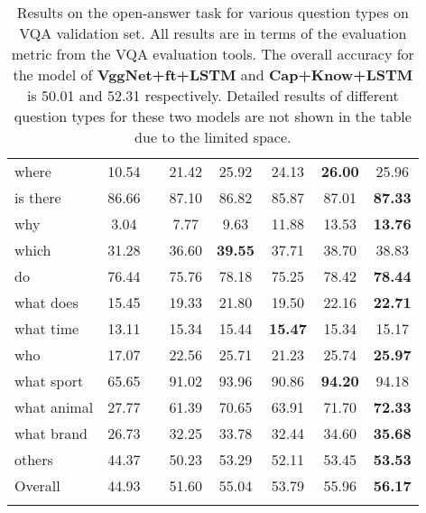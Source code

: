 \documentclass[10pt,journal,compsoc]{IEEEtran}
\begin{document}
\begin{table}[t!]
{\begin{tabular}{lclccccc}
  where                        & 10.54        &  & 21.42            & 25.92            & 24.13            & \textbf{26.00}   & 25.96 \\
  is there                     & 86.66        &  & 87.10            & 86.82            & 85.87            & 87.01            & \textbf{87.33} \\
  why                          & 3.04         &  & 7.77             & 9.63             & 11.88            & 13.53            & \textbf{13.76}  \\
  which                        & 31.28        &  & 36.60            & \textbf{39.55}   & 37.71            & 38.70            & 38.83 \\
  do                           & 76.44        &  & 75.76            & 78.18            & 75.25            & 78.42            & \textbf{78.44} \\
  what does                    & 15.45        &  & 19.33            & 21.80            & 19.50            & 22.16            & \textbf{22.71} \\
  what time                    & 13.11        &  & 15.34            & 15.44            & \textbf{15.47}   & 15.34            & 15.17 \\
  who                          & 17.07        &  & 22.56            & 25.71            & 21.23            & 25.74            & \textbf{25.97} \\
  what sport                   & 65.65        &  & 91.02            & 93.96            & 90.86            & \textbf{94.20}   & 94.18 \\
  what animal                  & 27.77        &  & 61.39            & 70.65            & 63.91            & 71.70            & \textbf{72.33} \\
  what brand                   & 26.73        &  & 32.25            & 33.78            & 32.44            & 34.60            & \textbf{35.68} \\
  others                       & 44.37        &  & 50.23            & 53.29            & 52.11            & 53.45            & \textbf{53.53}     \\ \hline
  Overall                      & 44.93        &  & 51.60            & 55.04            & 53.79            & 55.96            & \textbf{56.17} \\ \Xhline{2\arrayrulewidth}
 \end{tabular}}
\vspace{1pt}
\caption{Results on the open-answer task for various question types on VQA validation set. All results are in terms of the evaluation metric from the VQA evaluation tools. The overall accuracy for the model of \textbf{VggNet+ft+LSTM} and \textbf{Cap+Know+LSTM} is 50.01 and 52.31 respectively. Detailed results of different question types for these two models are not shown in the table due to the limited space.}
\vspace{-12pt}
\label{tab:COCO_Results}
\end{table}
\end{document}
